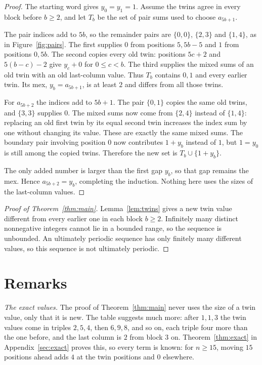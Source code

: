 \documentclass[11pt]{amsart}
\theoremstyle{remark}
\begin{document}
\begin{proof}
The starting word gives $y_0=y_1=1$. Assume the twins agree in every block before $b\ge2$, and let $T_b$ be the set of pair sums used to choose $a_{5b+1}$.

The pair indices add to $5b$, so the remainder pairs are $\{0,0\}$, $\{2,3\}$ and $\{1,4\}$, as in Figure~\ref{fig:pairs}. The first supplies $0$ from positions $5,5b-5$ and $1$ from positions $0,5b$. The second copies every old twin: positions $5c+2$ and $5(b-c)-2$ give $y_c+0$ for $0\le c<b$. The third supplies the mixed sums of an old twin with an old last-column value. Thus $T_b$ contains $0,1$ and every earlier twin. Its mex, $y_b=a_{5b+1}$, is at least $2$ and differs from all those twins.

For $a_{5b+2}$ the indices add to $5b+1$. The pair $\{0,1\}$ copies the same old twins, and $\{3,3\}$ supplies $0$. The mixed sums now come from $\{2,4\}$ instead of $\{1,4\}$: replacing an old first twin by its equal second twin increases the index sum by one without changing its value. These are exactly the same mixed sums. The boundary pair involving position $0$ now contributes $1+y_b$ instead of $1$, but $1=y_0$ is still among the copied twins. Therefore the new set is $T_b\cup\{1+y_b\}$.

The only added number is larger than the first gap $y_b$, so that gap remains the mex. Hence $a_{5b+2}=y_b$, completing the induction. Nothing here uses the sizes of the last-column values.
\end{proof}

\begin{proof}[Proof of Theorem~\ref{thm:main}]
Lemma~\ref{lem:twins} gives a new twin value different from every earlier one in each block $b\ge2$. Infinitely many distinct nonnegative integers cannot lie in a bounded range, so the sequence is unbounded. An ultimately periodic sequence has only finitely many different values, so this sequence is not ultimately periodic.
\end{proof}

\section{Remarks}\label{sec:remarks}

\emph{The exact values.} The proof of Theorem~\ref{thm:main} never uses the size of a twin value, only that it is new. The table suggests much more: after $1,1,3$ the twin values come in triples $2,5,4$, then $6,9,8$, and so on, each triple four more than the one before, and the last column is $2$ from block $3$ on. Theorem~\ref{thm:exact} in Appendix~\ref{sec:exact} proves this, so every term is known: for $n\ge15$, moving $15$ positions ahead adds $4$ at the twin positions and $0$ elsewhere.
\end{document}

